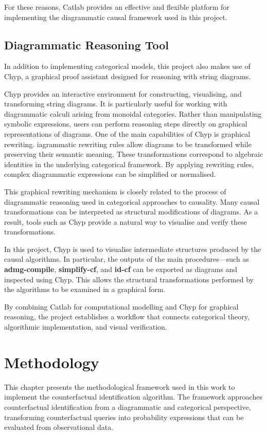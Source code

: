 \documentclass[a4paper]{report}
\begin{document}
For these reasons, Catlab provides an effective and flexible platform for implementing the diagrammatic causal framework used in this project.

\section{Diagrammatic Reasoning Tool}
In addition to implementing categorical models, this project also makes use of Chyp, a graphical proof assistant designed for reasoning with string diagrams.

Chyp provides an interactive environment for constructing, visualising, and transforming string diagrams. It is particularly useful for working with diagrammatic calculi arising from monoidal categories. Rather than manipulating symbolic expressions, users can perform reasoning steps directly on graphical representations of diagrams. One of the main capabilities of Chyp is graphical rewriting. iagrammatic rewriting rules allow diagrams to be transformed while preserving their semantic meaning. These transformations correspond to algebraic identities in the underlying categorical framework. By applying rewriting rules, complex diagrammatic expressions can be simplified or normalised.

This graphical rewriting mechanism is closely related to the process of diagrammatic reasoning used in categorical approaches to causality. Many causal transformations can be interpreted as structural modifications of diagrams. As a result, tools such as Chyp provide a natural way to visualise and verify these transformations.

In this project, Chyp is used to visualise intermediate structures produced by the causal algorithms. In particular, the outputs of the main procedures—such as \textbf{admg-compile}, \textbf{simplify-cf}, and \textbf{id-cf} can be exported as diagrams and inspected using Chyp. This allows the structural transformations performed by the algorithms to be examined in a graphical form.

By combining Catlab for computational modelling and Chyp for graphical reasoning, the project establishes a workflow that connects categorical theory, algorithmic implementation, and visual verification.

\chapter{Methodology}
This chapter presents the methodological framework used in this work to implement the counterfactual identification algorithm. 
The framework approaches counterfactual identification from a diagrammatic and categorical perspective, transforming counterfactual queries into probability expressions that can be evaluated from observational data.
\end{document}
